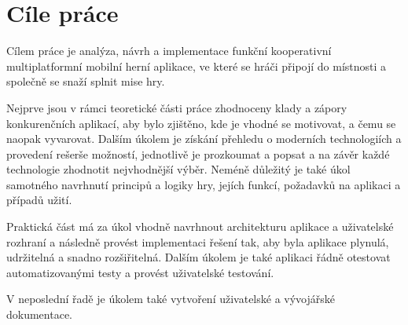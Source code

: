 \chapter{Cíle práce}
\label{chap:goals}

Cílem práce je analýza, návrh a implementace funkční
kooperativní multiplatformní mobilní herní aplikace,
ve které se hráči připojí do místnosti a společně se snaží splnit mise hry.

Nejprve jsou v rámci teoretické části práce zhodnoceny klady a zápory
konkurenčních aplikací,
aby bylo zjištěno,
kde je vhodné se motivovat, a čemu se naopak vyvarovat.
Dalším úkolem je získání přehledu o moderních technologiích
a provedení rešerše možností, jednotlivě je prozkoumat a popsat
a na závěr každé technologie zhodnotit nejvhodnější výběr.
Neméně důležitý je také úkol samotného navrhnutí principů a logiky hry,
jejích funkcí, požadavků na aplikaci a případů užití.

Praktická část má za úkol vhodně navrhnout architekturu aplikace
a uživatelské rozhraní a následně provést implementaci řešení tak,
aby byla aplikace plynulá, udržitelná a snadno rozšiřitelná.
Dalším úkolem je také aplikaci řádně otestovat automatizovanými testy 
a provést uživatelské testování.

V neposlední řadě je úkolem také vytvoření uživatelské a vývojářské
dokumentace.
